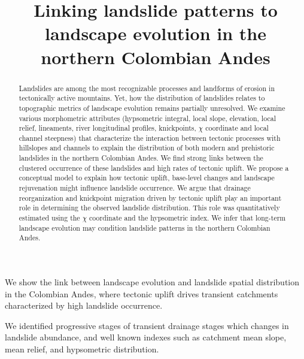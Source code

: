 \documentclass[draft]{agujournal2019}
\begin{document}
\title{Linking landslide patterns to landscape evolution in the northern Colombian Andes}




\begin{keypoints}
\item We show the link between landscape evolution and landslide spatial distribution in the Colombian Andes, where tectonic uplift drives transient catchments characterized by high landslide occurrence.
\item We identified progressive stages of transient drainage stages which changes in landslide abundance, and well known indexes such as catchment mean slope, mean relief, and hypsometric distribution.
\end{keypoints}

\begin{abstract}
Landslides are among the most recognizable processes and landforms of erosion in tectonically active mountains. Yet, how the distribution of landslides relates to topographic metrics of landscape evolution remains partially unresolved. We examine various morphometric attributes (hypsometric integral, local slope, elevation, local relief, lineaments, river longitudinal profiles, knickpoints, $\chi$ coordinate and local channel steepness) that characterize the interaction between tectonic processes with hillslopes and channels to explain the distribution of both modern and prehistoric landslides in the northern Colombian Andes. We find strong links between the clustered occurrence of these landslides and high rates of tectonic uplift. We propose a conceptual model to explain how tectonic uplift, base-level changes and landscape rejuvenation might influence landslide occurrence. We argue that drainage reorganization and knickpoint migration driven by tectonic uplift play an important role in determining the observed landslide distribution. This role was quantitatively estimated using the $\chi$ coordinate and the hypsometric index. We infer that long-term landscape evolution may condition landslide patterns in the northern Colombian Andes.
\end{abstract}
\end{document}

